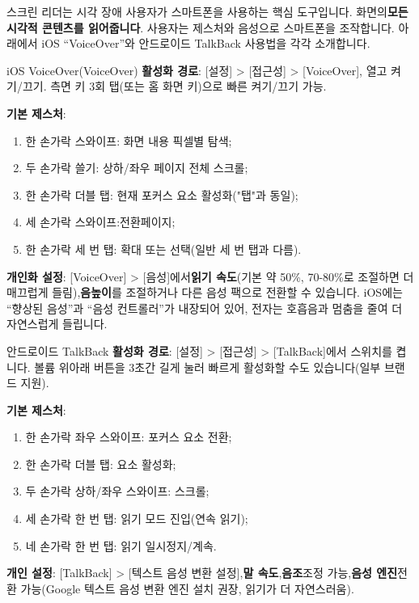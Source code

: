 
스크린 리더는 시각 장애 사용자가 스마트폰을 사용하는 핵심 도구입니다. 화면의\textbf{모든 시각적 콘텐츠를 읽어줍니다}. 사용자는 제스처와 음성으로 스마트폰을 조작합니다. 아래에서 iOS “VoiceOver”와 안드로이드 TalkBack 사용법을 각각 소개합니다.

\begin{tcbinfo}{iOS VoiceOver(VoiceOver)}
\textbf{활성화 경로}: [설정] > [접근성] > [VoiceOver], 열고 켜기/끄기. 측면 키 3회 탭(또는 홈 화면 키)으로 빠른 켜기/끄기 가능.

\textbf{기본 제스처}:

\begin{enumerate}
  \item 한 손가락 스와이프: 화면 내용 픽셀별 탐색;
  \item 두 손가락 쓸기: 상하/좌우 페이지 전체 스크롤;
  \item 한 손가락 더블 탭: 현재 포커스 요소 활성화("탭"과 동일);
  \item 세 손가락 스와이프:전환페이지;
  \item 한 손가락 세 번 탭: 확대 또는 선택(일반 세 번 탭과 다름).
\end{enumerate}

\textbf{개인화 설정}: [VoiceOver] > [음성]에서\textbf{읽기 속도}(기본 약 50\%, 70-80\%로 조절하면 더 매끄럽게 들림),\textbf{음높이}를 조절하거나 다른 음성 팩으로 전환할 수 있습니다. iOS에는 “향상된 음성”과 “음성 컨트롤러”가 내장되어 있어, 전자는 호흡음과 멈춤을 줄여 더 자연스럽게 들립니다.

\end{tcbinfo}

\begin{tcbinfo}{안드로이드 TalkBack}
\textbf{활성화 경로}: [설정] > [접근성] > [TalkBack]에서 스위치를 켭니다. 볼륨 위아래 버튼을 3초간 길게 눌러 빠르게 활성화할 수도 있습니다(일부 브랜드 지원).

\textbf{기본 제스처}:

\begin{enumerate}
  \item 한 손가락 좌우 스와이프: 포커스 요소 전환;
  \item 한 손가락 더블 탭: 요소 활성화;
  \item 두 손가락 상하/좌우 스와이프: 스크롤;
  \item 세 손가락 한 번 탭: 읽기 모드 진입(연속 읽기);
  \item 네 손가락 한 번 탭: 읽기 일시정지/계속.
\end{enumerate}

\textbf{개인 설정}: [TalkBack] > [텍스트 음성 변환 설정],\textbf{말 속도},\textbf{음조}조정 가능,\textbf{음성 엔진}전환 가능(Google 텍스트 음성 변환 엔진 설치 권장, 읽기가 더 자연스러움).

\end{tcbinfo}

